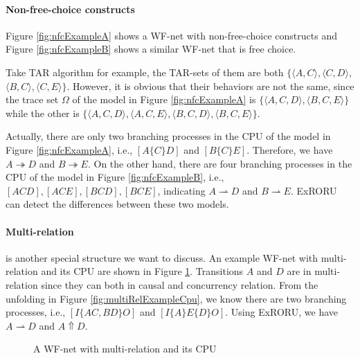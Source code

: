 \documentclass[dvips,...]{llncs}
\begin{document}
\paragraph{Non-free-choice constructs}\label{par:nfc} 
Figure \ref{fig:nfcExampleA} shows a WF-net with non-free-choice constructs \cite{de2003workflow} and Figure \ref{fig:nfcExampleB} shows a similar WF-net that is free choice.

Take TAR algorithm for example, the TAR-sets of them are both $\{\langle A,C\rangle, \langle C,D\rangle$, $\langle B,C\rangle, \langle C,E\rangle\}$. However, it is obvious that their behaviors are not the same, since the trace set $\Omega$ of the model in Figure \ref{fig:nfcExampleA} is $\{\langle A,C,D\rangle,\langle B,C,E\rangle\}$ while the other is $\{\langle A,C,D\rangle,\langle A,C,E\rangle,\langle B,C,D\rangle,\langle B,C,E\rangle\}$.

Actually, there are only two branching processes in the CPU of the model in Figure \ref{fig:nfcExampleA}, i.e., $[A\{C\}D]$ and $[B\{C\}E]$. Therefore, we have $A\twoheadrightarrow D$ and $B\twoheadrightarrow E$. On the other hand, there are four branching processes in the CPU of the model in Figure \ref{fig:nfcExampleB}, i.e., $[ACD],[ACE],[BCD],[BCE]$, indicating $A\rightharpoonup D$ and $B\rightharpoonup E$. ExRORU can detect the differences between these two models.

\paragraph{Multi-relation} is another special structure we want to discuss. An example WF-net with multi-relation and its CPU are shown in Figure \ref{fig:exampleMultiRelation}. Transitions $A$ and $D$ are in multi-relation since they can both in causal and concurrency relation. From the unfolding in Figure \ref{fig:multiRelExampleCpu}, we know there are two branching processes, i.e., $[I\{AC,BD\}O]$ and $[I\{A\}E\{D\}O]$. Using ExRORU, we have $A\rightharpoonup D$ and $A\Uparrow D$.

\begin{figure}[htbp]
\centering
{}
\caption{A WF-net with multi-relation and its CPU\label{fig:exampleMultiRelation}}
\end{figure}
\end{document}
